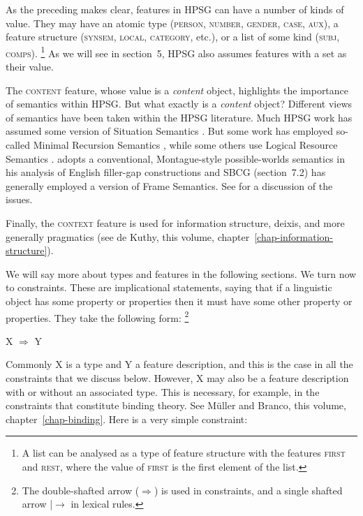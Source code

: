 \documentclass[output=paper
	        ,collection
	        ,collectionchapter
 	        ,biblatex
                ,babelshorthands
                ,newtxmath
                ,draftmode
                ,colorlinks, citecolor=brown
]{langscibook}
\begin{document}
As the preceding makes clear, features in HPSG can have a number of kinds of value. They may have an atomic type (\textsc{person, number, gender, case, aux}), a feature structure (\textsc{synsem, local, category}, etc.), or a list of some kind (\textsc{subj, comps}).%
%
\footnote{A list can be analysed as a type of feature structure with the features \textsc{first} and \textsc{rest}, where the value of \textsc{first} is the first element of the list.}
%
As we will see in section~5, HPSG also assumes features with a set as their value.

The \textsc{content} feature, whose value is a \emph{content} object, highlights the importance of semantics within HPSG. But what exactly is a \emph{content} object? Different views of semantics have been taken within the HPSG literature. Much HPSG work has assumed some version of Situation Semantics \citep{BP83a}. But some work has employed so-called Minimal Recursion Semantics \citep{CFPS2005a}, while some others use Logical Resource Semantics \citep{RichterandSailer2001}. \citet[501]{Sag2010b} adopts a conventional, Montague-style possible-worlds semantics in his analysis of English filler-gap constructions and SBCG (section~7.2) has generally employed a version of Frame Semantics. See  for a discussion of the issues.

Finally, the \textsc{context} feature is used for information structure, deixis, and more generally pragmatics (see de Kuthy, this volume, chapter~\ref{chap-information-structure}).

We will say more about types and features in the following sections. We turn now to constraints. These are implicational statements, saying that if a linguistic object has some property or properties then it must have some other property or properties. They take the following form:%
%
\footnote{The double-shafted arrow ($\Rightarrow$) is used in constraints, and a single shafted arrow |$\rightarrow$ in lexical rules.}
%

\ea\label{ex:prop10}
X $\Rightarrow$ Y
\z

Commonly X is a type and Y a feature description, and this is the case in all the constraints that we discuss below. However, X may also be a feature description with or without an associated type. This is necessary, for example, in the constraints that constitute binding theory. See Müller and Branco, this volume, chapter~\ref{chap-binding}. Here is a very simple constraint:
\end{document}
